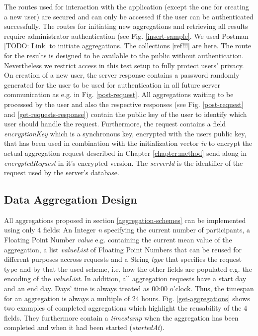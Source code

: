 
The routes used for interaction with the application (except the one for creating a new user) are secured and can only be accessed if the user can be authenticated successfully. The routes for initiating new aggregations and retrieving all results require administrator authentication (see Fig. \ref{insert-sample}. We used Postman [TODO: Link] to initiate aggregations. The collections [ref!!!] are here. The route for the results is designed to be available to the public without authentication. Nevertheless we restrict access in this test setup to fully protect users' privacy.
On creation of a new user, the server response contains a password randomly generated for the user to be used for authentication in all future server communication as e.g. in Fig. \ref{post-request}. All aggregations waiting to be processed by the user and also the respective responses (see Fig. \ref{post-request} and \ref{get-requests-response}) contain the public key of the user to identify which user should handle the request. Furthermore, the request contains a field \textit{encryptionKey} which is a synchronous key, encrypted with the users public key, that has been used in combination with the initialization vector \textit{iv} to encrypt the actual aggregation request described in Chapter \ref{chapter:method} send along in \textit{encryptedRequest} in it's encrypted version. The \textit{serverId} is the identifier of the request used by the server's database.


\subsection{Data Aggregation Design}\label{data-aggregation-design}
All aggregations proposed in section \ref{aggregation-schemes} can be implemented using only 4 fields: An Integer \textit{n} specifying the current number of participants, a Floating Point Number \textit{value} e.g. containing the current mean value of the aggregation, a list \textit{valueList} of Floating Point Numbers that can be reused for different purposes accross requests and a String \textit{type} that specifies the request type and by that the used scheme, i.e. how the other fields are populated e.g. the encoding of the \textit{valueList}. In addition, all aggregation requests have a start day and an end day. Days' time is always treated as 00:00 o'clock. Thus, the timespan for an aggregation is always a multiple of 24 hours. Fig. \ref{get-aggregations} shows two examples of completed aggregations which highlight the reusability of the 4 fields. They furthermore contain a \textit{timestamp} when the aggregation has been completed and when it had been started (\textit{startedAt}).\\

